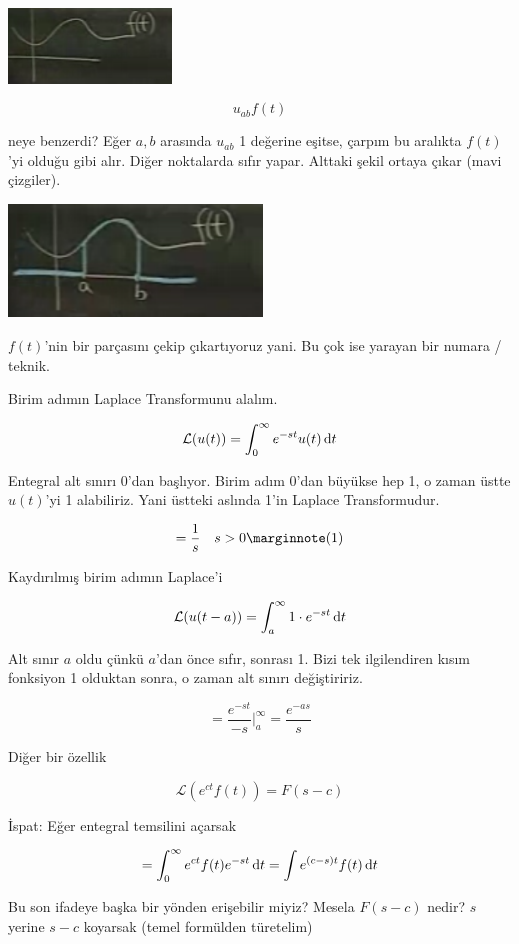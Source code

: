 \documentclass[12pt,fleqn]{article}\usepackage{../../common}
\begin{document}
\includegraphics[height=2cm]{22_4.png}

$$ u_{ab}f(t) $$

neye benzerdi? Eğer $a,b$ arasında $u_{ab}$ 1 değerine eşitse, çarpım bu
aralıkta $f(t)$'yi olduğu gibi alır. Diğer noktalarda sıfır yapar. Alttaki
şekil ortaya çıkar (mavi çizgiler). 

\includegraphics[height=3cm]{22_5.png}

$f(t)$'nin bir parçasını çekip çıkartıyoruz yani. Bu çok ise yarayan bir
numara / teknik. 

Birim adımın Laplace Transformunu alalım.

$$ \mathcal{L}(u(t)) = \int_{0}^{\infty} e^{-st} u(t) \,\mathrm{d} t  $$

Entegral alt sınırı 0'dan başlıyor. Birim adım 0'dan büyükse hep 1, o zaman
üstte $u(t)$'yi 1 alabiliriz. Yani üstteki aslında 1'in Laplace
Transformudur. 

$$ = \frac{1}{s} \ \ \ s>0 
\mlabel{1}
$$

Kaydırılmış birim adımın Laplace'i

$$
\mathcal{L} (u(t-a)) = 
\int_{a}^{\infty} 1 \cdot e^{-st} \,\mathrm{d} t
$$

Alt sınır $a$ oldu çünkü $a$'dan önce sıfır, sonrası 1. Bizi tek
ilgilendiren kısım fonksiyon 1 olduktan sonra, o zaman alt sınırı 
değiştiririz. 

$$ = \frac{e^{-st}}{-s} \bigg|_{a}^{\infty} =
\frac{e^{-as}}{s}
$$

Diğer bir özellik

$$ \mathcal{L}(e^{ct}f(t)) = F(s-c) $$

İspat: Eğer entegral temsilini açarsak

$$
= \int_{0}^{\infty} e^{ct}f(t)e^{-st} \,\mathrm{d} t  = \int e^{(c-s)t} f(t) \,\mathrm{d} t
$$

Bu son ifadeye başka bir yönden erişebilir miyiz? Mesela $F(s-c)$ nedir? 
$s$ yerine $s-c$ koyarsak (temel formülden türetelim)
\end{document}
